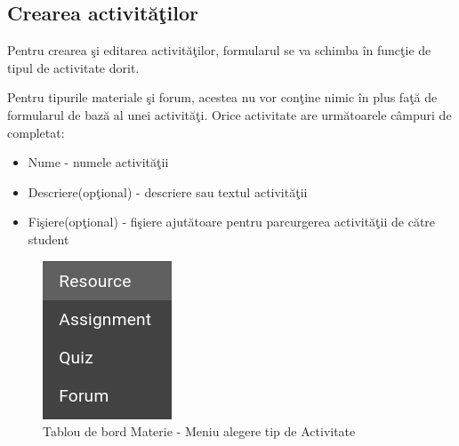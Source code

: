 \documentclass[12pt, a4paper, oneside, romanian]{teza-upb}
\begin{document}
\subsection{Crearea activităţilor}

Pentru crearea şi editarea activităţilor, formularul se va schimba în funcţie de tipul de activitate dorit.

Pentru tipurile materiale şi forum, acestea nu vor conţine nimic în plus faţă de formularul de bază al unei activităţi. Orice activitate are următoarele câmpuri de completat:
\begin{itemize}
	\item Nume - numele activităţii
	\item Descriere(opţional) - descriere sau textul activităţii
	\item Fişiere(opţional) - fişiere ajutătoare pentru parcurgerea activităţii de către student
\end{itemize}

\begin{figure}[H]
\centering
\includegraphics*[width=0.2\columnwidth]{tablou-de-bord-materie-meniu-alegere-tip-de-activitate}
\caption{Tablou de bord Materie - Meniu alegere tip de Activitate}
\label{tablou-de-bord-materie-meniu-alegere-tip-de-activitate}
\end{figure}
\end{document}
